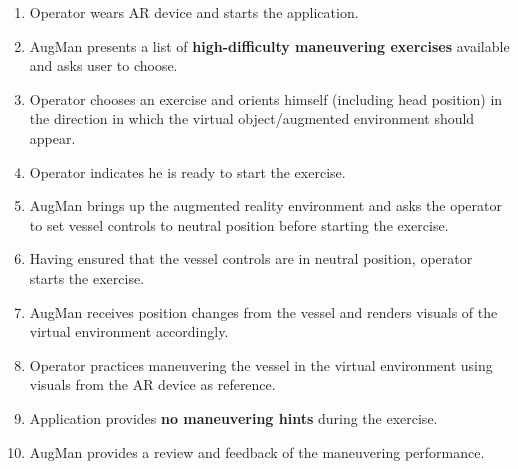 \begin{enumerate}[noitemsep]
	\item Operator wears AR device and starts the application. 
	\item AugMan presents a list of \textbf{high-difficulty maneuvering exercises} available and asks user to choose.
	\item Operator chooses an exercise and orients himself (including head position) in the direction in which the virtual object/augmented environment should appear.
	\item Operator indicates he is ready to start the exercise.
	\item AugMan brings up the augmented reality environment and asks the operator to set vessel controls to neutral position before starting the exercise.
	\item Having ensured that the vessel controls are in neutral position, operator starts the exercise. 
	\item AugMan receives position changes from the vessel and renders visuals of the virtual environment accordingly.
	\item Operator practices maneuvering the vessel in the virtual environment using visuals from the AR device as reference.
	\item Application provides \textbf{no maneuvering hints} during the exercise.
	\item AugMan provides a review and feedback of the maneuvering performance.
\end{enumerate}

